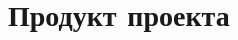 \section{Продукт проекта}

\begin{frame}
\frametitle{\insertsection} 
\framesubtitle{\insertsubsection}
\end{frame}